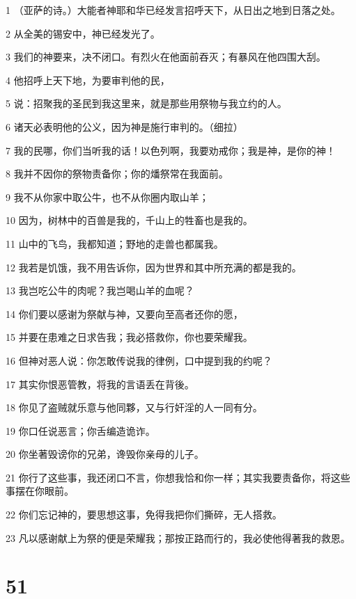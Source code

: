 \par 1 （亚萨的诗。）大能者神耶和华已经发言招呼天下，从日出之地到日落之处。
\par 2 从全美的锡安中，神已经发光了。
\par 3 我们的神要来，决不闭口。有烈火在他面前吞灭；有暴风在他四围大刮。
\par 4 他招呼上天下地，为要审判他的民，
\par 5 说：招聚我的圣民到我这里来，就是那些用祭物与我立约的人。
\par 6 诸天必表明他的公义，因为神是施行审判的。（细拉）
\par 7 我的民哪，你们当听我的话！以色列啊，我要劝戒你；我是神，是你的神！
\par 8 我并不因你的祭物责备你；你的燔祭常在我面前。
\par 9 我不从你家中取公牛，也不从你圈内取山羊；
\par 10 因为，树林中的百兽是我的，千山上的牲畜也是我的。
\par 11 山中的飞鸟，我都知道；野地的走兽也都属我。
\par 12 我若是饥饿，我不用告诉你，因为世界和其中所充满的都是我的。
\par 13 我岂吃公牛的肉呢？我岂喝山羊的血呢？
\par 14 你们要以感谢为祭献与神，又要向至高者还你的愿，
\par 15 并要在患难之日求告我；我必搭救你，你也要荣耀我。
\par 16 但神对恶人说：你怎敢传说我的律例，口中提到我的约呢？
\par 17 其实你恨恶管教，将我的言语丢在背後。
\par 18 你见了盗贼就乐意与他同夥，又与行奸淫的人一同有分。
\par 19 你口任说恶言；你舌编造诡诈。
\par 20 你坐著毁谤你的兄弟，谗毁你亲母的儿子。
\par 21 你行了这些事，我还闭口不言，你想我恰和你一样；其实我要责备你，将这些事摆在你眼前。
\par 22 你们忘记神的，要思想这事，免得我把你们撕碎，无人搭救。
\par 23 凡以感谢献上为祭的便是荣耀我；那按正路而行的，我必使他得著我的救恩。

\chapter{51}

